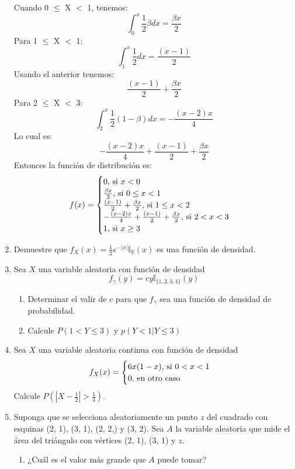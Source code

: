 \documentclass[12pt,a4paper]{report}
\begin{document}
\begin{enumerate}
{			Cuando 0 $\leq$ X $<$ 1, tenemos:
		    \[\int_{0}^{x} \frac{1}{2}\beta dx = \frac{\beta x}{2}\]
		    Para 1 $\leq$ X $<$ 1:
		    \[\int_{1}^{x} \frac{1}{2}dx = \frac{(x-1)}{2}\]
		    Usando el anterior tenemos:
		    \[\frac{(x-1)}{2} +  \frac{\beta x}{2} \]
		    Para 2 $\leq$ X $<$ 3:
		     \[\int_{2}^{x}\frac{1}{2}(1-\beta)dx = -\frac{(x-2)x}{4}\]
		     Lo cual es:
		     \[-\frac{(x-2)x}{4} + \frac{(x-1)}{2} +  \frac{\beta x}{2}\]
		     Entonces la función de distribución es:
		     	\[
				f(x) = \begin{cases}
								0, $ si $ x < 0\\
								\frac{\beta x}{2}, $ si $ 0 \leq x < 1\\
								\frac{(x-1)}{2} +  \frac{\beta x}{2}, $ si $ 1 \leq x < 2\\
								-\frac{(x-2)x}{4} + \frac{(x-1)}{2} +  \frac{\beta x}{2}, $ si $ 2 < x < 3\\
								1, $ si $ x \geq 3
						 	 \end{cases}
			\]
		}
		\item {
			Demuestre que $f_X(x) = \frac{1}{2}e^{-|x|}\mathbb{I}_\mathbb{R}(x)$ es
			una función de densidad.
		}
		\item {
			Sea $X$ una variable aleatoria con función de densidad
				\[f_\gamma(y) = cy \mathbb{I}_{\{1, 2, 3, 4\}}(y)\]
				\begin{enumerate}
					\item {
						Determinar el valir de $c$ para que $f_\gamma$ sea una función de
						densidad de probabilidad.
					}
					\item {
						Calcule $P(1 < Y \leq 3)$ y $p(Y < 1 | Y \leq 3)$
					}
				\end{enumerate}
		}
		\item {
			Sea $X$ una variable aleatoria continua con función de densidad
				\[
					f_X(x) = \begin{cases}
										6x(1-x), $ si $ 0 < x < 1\\
										0, $ en otro caso$
									 \end{cases}
				\]
			Calcule $P(|X-\frac{1}{2}| > \frac{1}{4})$.
		}
		\item {
			Suponga que se selecciona aleatoriamente un punto $z$ del cuadrado con
			esquinas (2, 1), (3, 1), (2, 2,) y (3, 2). Sea $A$ la variable aleatoria
			que mide el área del triángulo con vértices (2, 1), (3, 1) y $z$.
			\begin{enumerate}
				\item {
					¿Cuál es el valor más grande que $A$ puede tomar?
}
\end{enumerate}}
\end{enumerate}
\end{document}
